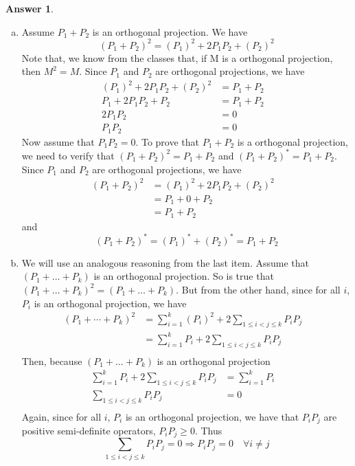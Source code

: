 \documentclass[12pt]{article}
\theoremstyle{plain}
\theoremstyle{definition}
\newtheorem{ans}{Answer}
\begin{document}
\begin{ans}
	\begin{enumerate}[(a)]
		\item Assume $P_1 + P_2$ is an orthogonal projection. We have
			\[ (P_1 + P_2)^2 = (P_1)^2 + 2P_1P_2 + (P_2)^2 \]
			Note that, we know from the classes that, if M is a orthogonal projection, then $M^2 = M$.
			Since $P_1$ and $P_2$ are orthogonal projections, we have
			\begin{align*}
				(P_1)^2 + 2P_1P_2 + (P_2)^2 &= P_1 + P_2&\\
				P_1 + 2P_1P_2 + P_2 &= P_1 + P_2&\\
				2P_1P_2 &= 0&\\
				P_1P_2 &= 0
			\end{align*}
			Now assume that $P_1P_2 = 0$. To prove that $P_1 + P_2$ is a orthogonal projection,
			we need to verify that $(P_1 + P_2)^2 = P_1 + P_2$ and $(P_1 + P_2)^{*}=P_1 + P_2$.
			Since $P_1$ and $P_2$ are orthogonal projections, we have
			\begin{align*}
				(P_1 + P_2)^2 &= (P_1)^2 + 2P_1P_2 + (P_2)^2&\\
				&= P_1 + 0 + P_2&\\
				&= P_1 + P_2
			\end{align*}
			and
			\[ (P_1 + P_2)^{*} = (P_1)^{*} + (P_2)^{*} = P_1 + P_2\]
		\item We will use an analogous reasoning from the last item.
			Assume that $(P_1 + \dots + P_k)$ is an orthogonal projection. So is true that
			$(P_1 + \dots + P_k)^2 = (P_1 + \dots + P_k)$.
			But from the other hand, since for all $i$, $P_i$ is an orthogonal projection, we have
			\begin{align*}
				(P_1 + \cdots + P_k)^2 &= \sum_{i=1}^{k} (P_i)^2 + 2\sum_{1 \leq i < j \leq k}P_iP_j&\\
				&= \sum_{i=1}^{k} P_i  + 2\sum_{1 \leq i < j \leq k}P_iP_j&\\
			\end{align*}
			Then, because $(P_1 + \dots + P_k)$ is an orthogonal projection
			\begin{align*}
				\sum_{i=1}^{k} P_i  + 2\sum_{1 \leq i < j \leq k}P_iP_j &= \sum_{i=1}^{k} P_i&\\
				\sum_{1 \leq i < j \leq k}P_iP_j &= 0&\\
			\end{align*}
			Again, since for all $i$, $P_i$ is an orthogonal projection, we have that $P_iP_j$
			are positive semi-definite operators, $P_iP_j \geq 0$. Thus
			\[ \sum_{1 \leq i < j \leq k}P_iP_j = 0 \Rightarrow P_iP_j = 0 \quad \forall i \neq j \]

\end{enumerate}
\end{ans}
\end{document}
